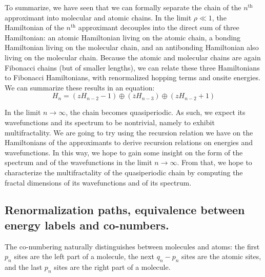 \documentclass[11pt]{article}
\newcommand{\zb}{\ensuremath{\overline{z}}}
\begin{document}
To summarize, we have seen that we can formally separate the chain of the $n^\text{th}$ approximant into molecular and atomic chains.
In the limit $\rho \ll 1$, the Hamiltonian of the $n^\text{th}$ approximant decouples into the direct sum of three Hamiltonian: an atomic Hamiltonian living on the atomic chain, a bonding Hamiltonian living on the molecular chain, and an antibonding Hamiltonian also living on the molecular chain. 
Because the atomic and molecular chains are again Fibonacci chains (but of smaller lengths), we can relate these three Hamiltonians to Fibonacci Hamiltonians, with renormalized hopping terms and onsite energies.
We can summarize these results in an equation:
\begin{equation}
	H_n = \left( z H_{n-2} - 1 \right) \oplus \left( \zb H_{n-3} \right) \oplus \left( z H_{n-2} + 1 \right) 
\end{equation}

In the limit $n \rightarrow \infty$, the chain becomes quasiperiodic. As such, we expect its wavefunctions and its spectrum to be nontrivial, namely to exhibit multifractality.
We are going to try using the recursion relation we have on the Hamiltonians of the approximants to derive recursion relations on energies and wavefunctions. In this way, we hope to gain some insight on the form of the spectrum and of the wavefunctions in the limit $n \rightarrow \infty$.
From that, we hope to characterize the multifractality of the quasiperiodic chain by computing the fractal dimensions of its wavefunctions and of its spectrum.

\subsection{Renormalization paths, equivalence between energy labels and co-numbers.}

The co-numbering naturally distinguishes between molecules and atoms: the first $p_n$ sites are the left part of a molecule, the next $q_n - p_n$ sites are the atomic sites, and the last $p_n$ sites are the right part of a molecule.

{}

\end{document}
